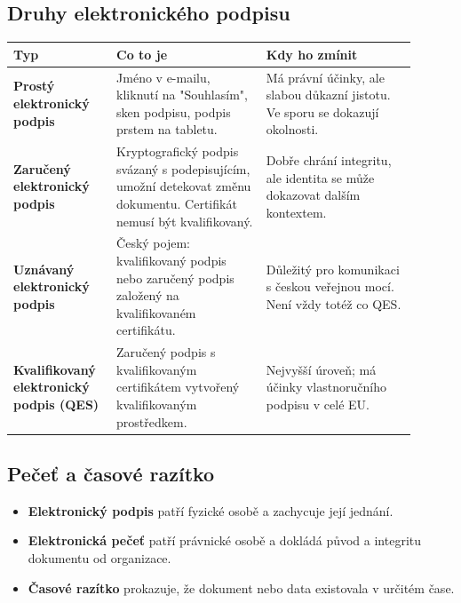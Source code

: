 
\subsection*{Druhy elektronického podpisu}
\begin{longtable}{p{0.22\linewidth}p{0.34\linewidth}p{0.34\linewidth}}
\toprule
\textbf{Typ} & \textbf{Co to je} & \textbf{Kdy ho zmínit}\\
\midrule
\textbf{Prostý elektronický podpis} & Jméno v e-mailu, kliknutí na "Souhlasím", sken podpisu, podpis prstem na tabletu. & Má právní účinky, ale slabou důkazní jistotu. Ve sporu se dokazují okolnosti.\\
\addlinespace
\textbf{Zaručený elektronický podpis} & Kryptografický podpis svázaný s podepisujícím, umožní detekovat změnu dokumentu. Certifikát nemusí být kvalifikovaný. & Dobře chrání integritu, ale identita se může dokazovat dalším kontextem.\\
\addlinespace
\textbf{Uznávaný elektronický podpis} & Český pojem: kvalifikovaný podpis nebo zaručený podpis založený na kvalifikovaném certifikátu. & Důležitý pro komunikaci s českou veřejnou mocí. Není vždy totéž co QES.\\
\addlinespace
\textbf{Kvalifikovaný elektronický podpis (QES)} & Zaručený podpis s kvalifikovaným certifikátem vytvořený kvalifikovaným prostředkem. & Nejvyšší úroveň; má účinky vlastnoručního podpisu v celé EU.\\
\bottomrule
\end{longtable}



\subsection*{Pečeť a časové razítko}
\begin{itemize}
  \item \textbf{Elektronický podpis} patří fyzické osobě a zachycuje její jednání.
  \item \textbf{Elektronická pečeť} patří právnické osobě a dokládá původ a integritu dokumentu od organizace.
  \item \textbf{Časové razítko} prokazuje, že dokument nebo data existovala v určitém čase.
\end{itemize}

